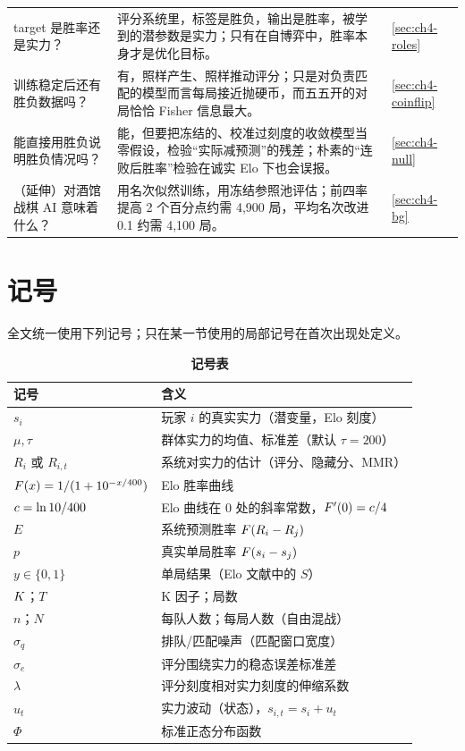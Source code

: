 {\begin{longtable}{@{}>{\raggedright\arraybackslash}p{3.5cm}>{\raggedright\arraybackslash}p{9.6cm}>{\raggedright\arraybackslash}p{2.0cm}@{}}
target 是胜率还是实力？ & 评分系统里，标签是胜负，输出是胜率，被学到的潜参数是实力；只有在自博弈中，胜率本身才是优化目标。 & \cref{sec:ch4-roles} \\
训练稳定后还有胜负数据吗？ & 有，照样产生、照样推动评分；只是对负责匹配的模型而言每局接近抛硬币，而五五开的对局恰恰 Fisher 信息最大。 & \cref{sec:ch4-coinflip} \\
能直接用胜负说明胜负情况吗？ & 能，但要把冻结的、校准过刻度的收敛模型当零假设，检验“实际减预测”的残差；朴素的“连败后胜率”检验在诚实 Elo 下也会误报。 & \cref{sec:ch4-null} \\
（延伸）对酒馆战棋 AI 意味着什么？ & 用名次似然训练，用冻结参照池评估；前四率提高 2 个百分点约需 4,900 局，平均名次改进 0.1 约需 4,100 局。 & \cref{sec:ch4-bg} \\
\end{longtable}
}

\section*{记号}

全文统一使用下列记号；只在某一节使用的局部记号在首次出现处定义。

\begin{table}[htbp]
  \centering\small
  \caption*{\small\textbf{记号表}}
  \begin{tabular}{@{}ll@{}}
    \toprule
    记号 & 含义 \\
    \midrule
    $s_i$ & 玩家 $i$ 的真实实力（潜变量，Elo 刻度） \\
    $\mu,\tau$ & 群体实力的均值、标准差（默认 $\tau=200$） \\
    $R_i$ 或 $R_{i,t}$ & 系统对实力的估计（评分、隐藏分、MMR） \\
    $F(x)=1/(1+10^{-x/400})$ & Elo 胜率曲线 \\
    $c=\ln 10/400$ & Elo 曲线在 0 处的斜率常数，$F'(0)=c/4$ \\
    $E$ & 系统预测胜率 $F(R_i-R_j)$ \\
    $p$ & 真实单局胜率 $F(s_i-s_j)$ \\
    $y\in\{0,1\}$ & 单局结果（Elo 文献中的 $S$） \\
    $K$；$T$ & K 因子；局数 \\
    $n$；$N$ & 每队人数；每局人数（自由混战） \\
    $\sigma_q$ & 排队/匹配噪声（匹配窗口宽度） \\
    $\sigma_e$ & 评分围绕实力的稳态误差标准差 \\
    $\lambda$ & 评分刻度相对实力刻度的伸缩系数 \\
    $u_t$ & 实力波动（状态），$s_{i,t}=s_i+u_t$ \\
    $\Phi$ & 标准正态分布函数 \\
    \bottomrule
  \end{tabular}
\end{table}

